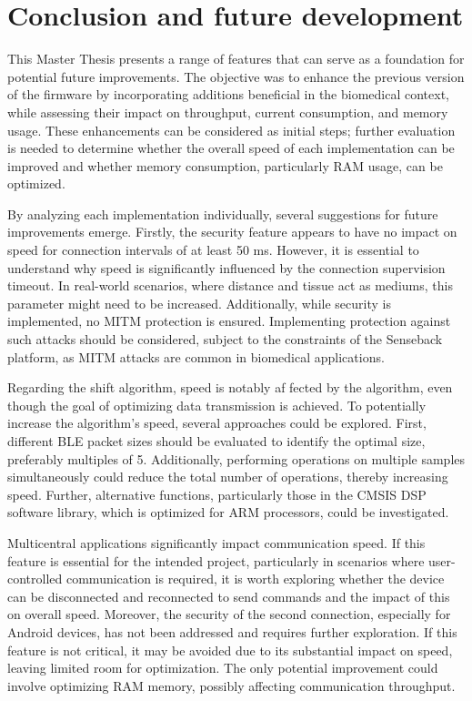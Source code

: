 \documentclass{Configuration_Files/PoliMi3i_thesis}
\begin{document}
\chapter{Conclusion and future development}

This Master Thesis presents a range of features that can serve as a foundation for potential future improvements. The objective was to enhance the previous version of the firmware by incorporating additions beneficial in the biomedical context, while assessing their impact on throughput, current consumption, and memory usage. These enhancements can be considered as initial steps; further evaluation is needed to determine whether the overall speed of each implementation can be improved and whether memory consumption, particularly RAM usage, can be optimized.

By analyzing each implementation individually, several suggestions for future improvements emerge. Firstly, the security feature appears to have no impact on speed for connection intervals of at least 50 ms. However, it is essential to understand why speed is significantly influenced by the connection supervision timeout. In real-world scenarios, where distance and tissue act as mediums, this parameter might need to be increased. Additionally, while security is implemented, no MITM protection is ensured. Implementing protection against such attacks should be considered, subject to the constraints of the Senseback platform, as MITM attacks are common in biomedical applications.

Regarding the shift algorithm, speed is notably af  fected by the algorithm, even though the goal of optimizing data transmission is achieved. To potentially increase the algorithm's speed, several approaches could be explored. First, different BLE packet sizes should be evaluated to identify the optimal size, preferably multiples of 5. Additionally, performing operations on multiple samples simultaneously could reduce the total number of operations, thereby increasing speed. Further, alternative functions, particularly those in the CMSIS DSP software library, which is optimized for ARM processors, could be investigated.

Multicentral applications significantly impact communication speed. If this feature is essential for the intended project, particularly in scenarios where user-controlled communication is required, it is worth exploring whether the device can be disconnected and reconnected to send commands and the impact of this on overall speed. Moreover, the security of the second connection, especially for Android devices, has not been addressed and requires further exploration. If this feature is not critical, it may be avoided due to its substantial impact on speed, leaving limited room for optimization. The only potential improvement could involve optimizing RAM memory, possibly affecting communication throughput.
\end{document}
